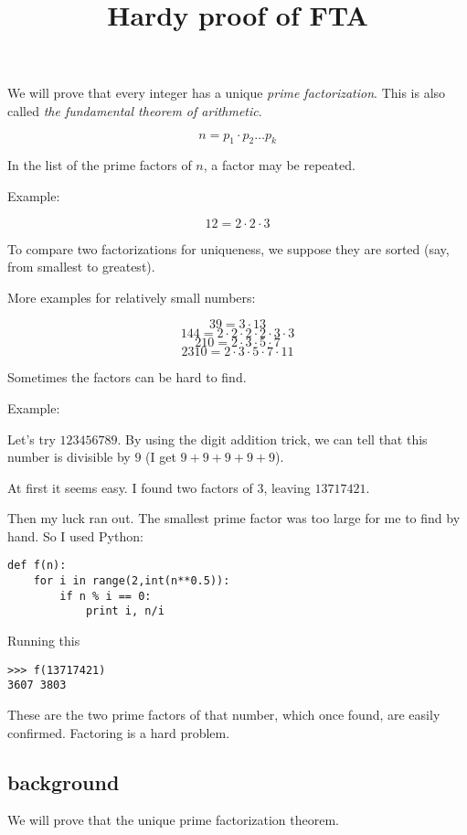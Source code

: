 \documentclass[11pt, oneside]{article}
\title{Hardy proof of FTA}
\date{}
\begin{document}
\maketitle
\Large

We will prove that every integer has a unique \emph{prime factorization}.  This is also called \emph{the fundamental theorem of arithmetic}.

\[ n = p_1 \cdot p_2 \dots p_k \]

In the list of the prime factors of $n$, a factor may be repeated.

Example:

\[ 12 = 2 \cdot 2 \cdot 3 \]

To compare two factorizations for uniqueness, we suppose they are sorted (say, from smallest to greatest).

More examples for relatively small numbers:

\[ 39 = 3 \cdot 13 \]
\[ 144 = 2 \cdot 2 \cdot 2 \cdot 2 \cdot 3 \cdot 3 \]
\[ 210 = 2 \cdot 3 \cdot 5 \cdot 7 \]
\[ 2310 = 2 \cdot 3 \cdot 5 \cdot 7 \cdot 11 \]

Sometimes the factors can be hard to find.

Example:

Let's try $123456789$.  By using the digit addition trick, we can tell that this number is divisible by $9$ (I get $9 + 9 + 9 + 9 + 9$).

At first it seems easy.  I found two factors of $3$, leaving $13717421$.

Then my luck ran out.  The smallest prime factor was too large for me to find by hand.  So I used Python:

\begin {verbatim}
def f(n):
    for i in range(2,int(n**0.5)):
        if n %
            print i, n/i
\end{verbatim}

Running this

\begin{verbatim}
>>> f(13717421)
3607 3803
\end{verbatim}

These are the two prime factors of that number, which once found, are easily confirmed.  Factoring is a hard problem.

\subsection*{background}

We will prove that the unique prime factorization theorem.
\end{document}
